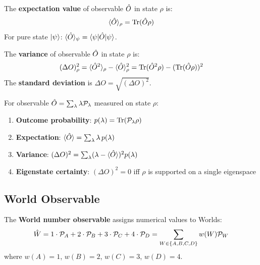 \begin{definition}
\label{def:expectation}
The \textbf{expectation value} of observable $\hat{O}$ in state $\rho$ is:
\[
\langle \hat{O} \rangle_\rho = \mathrm{Tr}(\hat{O} \rho)
\]
For pure state $|\psi\rangle$: $\langle \hat{O} \rangle_\psi = \langle \psi|\hat{O}|\psi\rangle$.
\end{definition}

\begin{definition}
\label{def:variance}
The \textbf{variance} of observable $\hat{O}$ in state $\rho$ is:
\[
(\Delta O)^2_\rho = \langle \hat{O}^2 \rangle_\rho - \langle \hat{O} \rangle_\rho^2 = \mathrm{Tr}(\hat{O}^2 \rho) - (\mathrm{Tr}(\hat{O} \rho))^2
\]
The \textbf{standard deviation} is $\Delta O = \sqrt{(\Delta O)^2}$.
\end{definition}

\begin{proposition}
\label{prop:observable-stats}
For observable $\hat{O} = \sum_\lambda \lambda \mathcal{P}_\lambda$ measured on state $\rho$:
\begin{enumerate}
  \item \textbf{Outcome probability}: $p(\lambda) = \mathrm{Tr}(\mathcal{P}_\lambda \rho)$
  \item \textbf{Expectation}: $\langle \hat{O} \rangle = \sum_\lambda \lambda \, p(\lambda)$
  \item \textbf{Variance}: $(\Delta O)^2 = \sum_\lambda (\lambda - \langle \hat{O} \rangle)^2 p(\lambda)$
  \item \textbf{Eigenstate certainty}: $(\Delta O)^2 = 0$ iff $\rho$ is supported on a single eigenspace
\end{enumerate}
\end{proposition}

\subsection{World Observable}

\begin{definition}
\label{def:world-observable}
The \textbf{World number observable} assigns numerical values to Worlds:
\[
\hat{W} = 1 \cdot \mathcal{P}_A + 2 \cdot \mathcal{P}_B + 3 \cdot \mathcal{P}_C + 4 \cdot \mathcal{P}_D = \sum_{W \in \{A,B,C,D\}} w(W) \mathcal{P}_W
\]
where $w(A) = 1$, $w(B) = 2$, $w(C) = 3$, $w(D) = 4$.
\end{definition}

